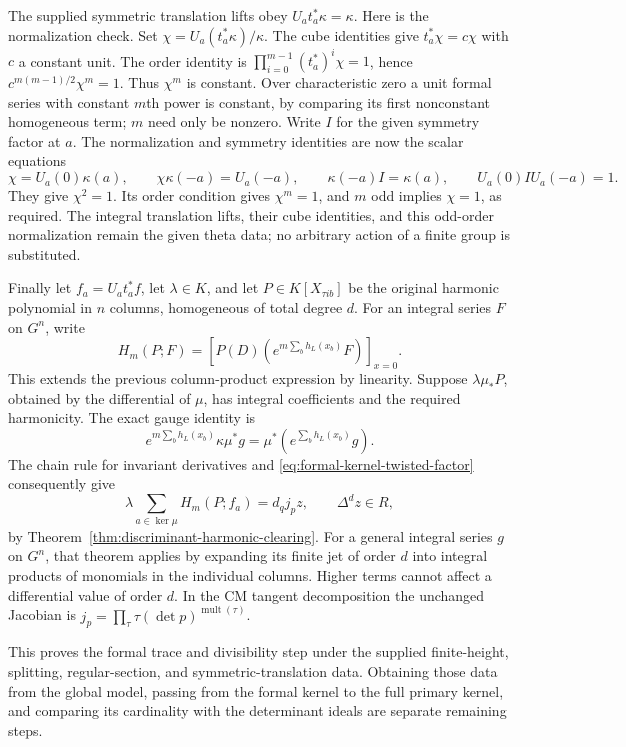 The supplied symmetric translation lifts obey
$U_a t_a^*\kappa=\kappa$.  Here is the normalization check.
Set $\chi=U_a(t_a^*\kappa)/\kappa$.
The cube identities give $t_a^*\chi=c\chi$ with $c$ a constant
unit.  The order identity is
$\prod_{i=0}^{m-1}(t_a^*)^i\chi=1$, hence
$c^{m(m-1)/2}\chi^m=1$.  Thus $\chi^m$ is constant.
Over characteristic zero a unit formal series with constant $m$th power
is constant, by comparing its first nonconstant homogeneous term; $m$
need only be nonzero.  Write $I$ for the given symmetry factor at $a$.
The normalization and symmetry identities are now the scalar equations
\[
 \chi=U_a(0)\kappa(a),\qquad
 \chi\kappa(-a)=U_a(-a),\qquad
 \kappa(-a)I=\kappa(a),\qquad
 U_a(0)I U_a(-a)=1.
\]
They give $\chi^2=1$.  Its order condition gives $\chi^m=1$, and $m$
odd implies $\chi=1$, as required.  The integral translation lifts,
their cube identities, and this odd-order normalization remain the given
theta data; no arbitrary action of a finite group is substituted.

Finally let $f_a=U_a t_a^*f$, let $\lambda\in K$, and let
$P\in K[X_{\tau i b}]$ be the original harmonic polynomial in $n$ columns,
homogeneous of total degree $d$.  For an integral series $F$ on $G^n$,
write
\[
 H_m(P;F)=\left[P(D)\left(e^{m\sum_bh_L(x_b)}F\right)\right]_{x=0}.
\]
This extends the previous column-product expression by linearity.
Suppose $\lambda\mu_*P$, obtained by the differential of $\mu$, has
integral coefficients and the required harmonicity.
The exact gauge identity is
\[
 e^{m\sum_bh_L(x_b)}\kappa\mu^*g
                   =\mu^*\left(e^{\sum_bh_L(x_b)}g\right).
\]
The chain rule for invariant derivatives and
\eqref{eq:formal-kernel-twisted-factor} consequently give
\[
       \lambda\sum_{a\in\ker\mu}H_m(P;f_a)=d_qj_p z,
                           \qquad \Delta^d z\in R,
\]
by Theorem~\ref{thm:discriminant-harmonic-clearing}.
For a general integral series $g$ on $G^n$, that theorem applies by
expanding its finite jet of order $d$ into integral products of monomials
in the individual columns.  Higher terms cannot affect a differential
value of order $d$.
In the CM tangent decomposition the unchanged Jacobian is
$j_p=\prod_\tau\tau(\det p)^{\operatorname{mult}(\tau)}$.

This proves the formal trace and divisibility step under the supplied
finite-height, splitting, regular-section, and symmetric-translation data.
Obtaining those data from the global model, passing from the formal kernel
to the full primary kernel, and comparing its cardinality with the
determinant ideals are separate remaining steps.
